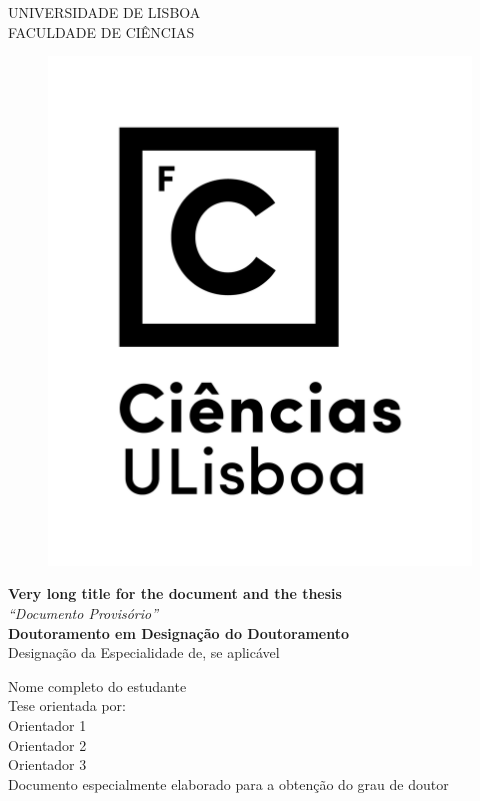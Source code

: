 \pagestyle{FirstPages}

\begin{center}
\begin{minipage}{0.45\linewidth}
    \centering
    UNIVERSIDADE DE LISBOA\\
    FACULDADE DE CI\^{E}NCIAS\\
\end{minipage}

\begin{figure}[h]
    \centering
    \includegraphics[width=0.35\columnwidth]{./logos/ciencias_vertical_rgb_preto.png}
\end{figure}

\vspace{1.0cm}
\textbf{\foreignlanguage{british}{Very long title for the document and the thesis}}\\
\vspace{1.0cm}
\textit{``Documento Provis\'{o}rio''}\\
\vspace{1.5cm}
\textbf{Doutoramento em Designação do Doutoramento}\\
{Designação da Especialidade de, se aplicável}
\vspace{3.5cm}

Nome completo do estudante\\
\vspace{1.5cm}
Tese orientada por:\\
Orientador 1\\
Orientador 2\\
Orientador 3\\
\vspace{2.0cm}
Documento especialmente elaborado para a obten\c{c}\~{a}o do grau de doutor
\vfill
\end{center}
